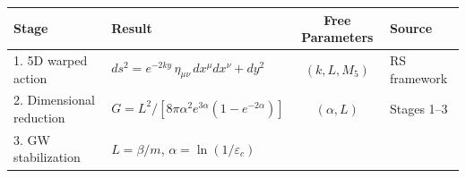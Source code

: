 \documentclass[
  11pt,
]{article}
\begin{document}
\begin{longtable}[]{@{}llcl@{}}
\toprule
\begin{minipage}[b]{0.24\columnwidth}\raggedright
Stage\strut
\end{minipage} & \begin{minipage}[b]{0.27\columnwidth}\raggedright
Result\strut
\end{minipage} & \begin{minipage}[b]{0.10\columnwidth}\centering
Free Parameters\strut
\end{minipage} & \begin{minipage}[b]{0.27\columnwidth}\raggedright
Source\strut
\end{minipage}\tabularnewline
\midrule
\endhead
\begin{minipage}[t]{0.24\columnwidth}\raggedright
1. 5D warped action\strut
\end{minipage} & \begin{minipage}[t]{0.27\columnwidth}\raggedright
\(ds^2 = e^{-2ky}\,\eta_{\mu\nu}\,dx^\mu dx^\nu + dy^2\)\strut
\end{minipage} & \begin{minipage}[t]{0.10\columnwidth}\centering
\((k, L, M_5)\)\strut
\end{minipage} & \begin{minipage}[t]{0.27\columnwidth}\raggedright
RS framework\strut
\end{minipage}\tabularnewline
\begin{minipage}[t]{0.24\columnwidth}\raggedright
2. Dimensional reduction\strut
\end{minipage} & \begin{minipage}[t]{0.27\columnwidth}\raggedright
\(G = L^2/[8\pi\alpha^2 e^{3\alpha}(1-e^{-2\alpha})]\)\strut
\end{minipage} & \begin{minipage}[t]{0.10\columnwidth}\centering
\((\alpha, L)\)\strut
\end{minipage} & \begin{minipage}[t]{0.27\columnwidth}\raggedright
Stages 1--3\strut
\end{minipage}\tabularnewline
\begin{minipage}[t]{0.24\columnwidth}\raggedright
3. GW stabilization\strut
\end{minipage} & \begin{minipage}[t]{0.27\columnwidth}\raggedright
\(L = \beta/m\), \(\alpha = \ln(1/\varepsilon_c)\)\strut
\end{minipage} & \begin{minipage}[t]{0.10\columnwidth}\centering

\end{minipage}
\end{longtable}
\end{document}
